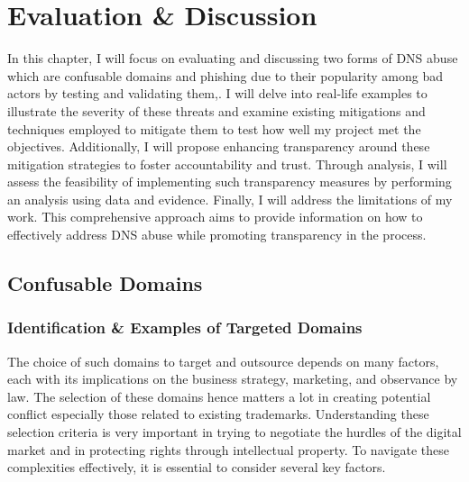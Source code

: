 \chapter{Evaluation \& Discussion}

In this chapter, I will focus on evaluating and discussing two forms of DNS abuse which are confusable domains and phishing due to their popularity among bad actors by testing and validating them,. I will delve into real-life examples to illustrate the severity of these threats and examine existing mitigations and techniques employed to mitigate them to test how well my project met the objectives. Additionally, I will propose enhancing transparency around these mitigation strategies to foster accountability and trust. Through analysis, I will assess the feasibility of implementing such transparency measures by performing an analysis using data and evidence. Finally, I will address the limitations of my work. This comprehensive approach aims to provide information on how to effectively address DNS abuse while promoting transparency in the process. 


\section{Confusable Domains}
\subsection{Identification \& Examples of Targeted Domains}

The choice of such domains to target and outsource depends on many factors, each with its implications on the business strategy, marketing, and observance by law. The selection of these domains hence matters a lot in creating potential conflict especially those related to existing trademarks. Understanding these selection criteria is very important in trying to negotiate the hurdles of the digital market and in protecting rights through intellectual property. To navigate these complexities effectively, it is essential to consider several key factors. 

